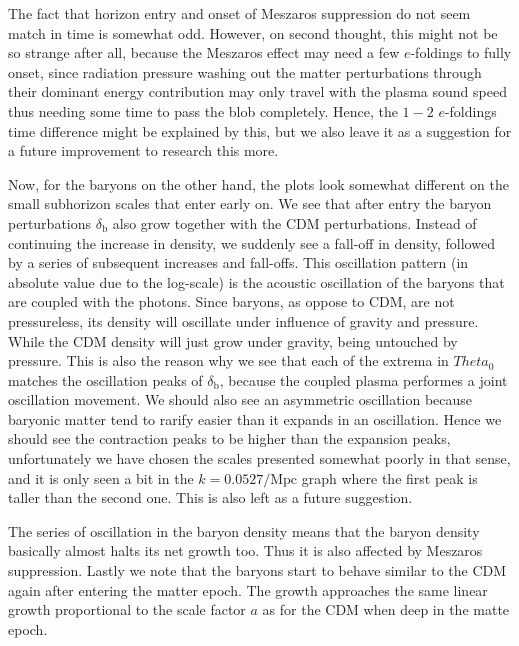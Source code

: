 \documentclass[twocolumn]{aastex62}
\begin{document}
The fact that horizon entry and onset of Meszaros suppression do not seem match in time is somewhat odd. However, on second thought, this might not be so strange after all, because the Meszaros effect may need a few $e$-foldings to fully onset, since radiation pressure washing out the matter perturbations through their dominant energy contribution may only travel with the plasma sound speed thus needing some time to pass the blob completely. Hence, the $1-2$ $e$-foldings time difference might be explained by this, but we also leave it as a suggestion for a future improvement to research this more.   

Now, for the baryons on the other hand, the plots look somewhat different on the small subhorizon scales that enter early on. We see that after entry the baryon perturbations $\delta_\text{b}$ also grow together with the CDM perturbations. Instead of continuing the increase in density, we suddenly see a fall-off in density, followed by a series of subsequent increases and fall-offs. This oscillation pattern (in absolute value due to the log-scale) is the acoustic oscillation of the baryons that are coupled with the photons. Since baryons, as oppose to CDM, are not pressureless, its density will oscillate under influence of gravity and pressure. While the CDM density will just grow under gravity, being untouched by pressure. This is also the reason why we see that each of the extrema in $Theta_0$ matches the oscillation peaks of $\delta_\text{b}$, because the coupled plasma performes a joint oscillation movement. We should also see an asymmetric oscillation because baryonic matter tend to rarify easier than it expands in an oscillation. Hence we should see the contraction peaks to be higher than the expansion peaks, unfortunately we have chosen the scales presented somewhat poorly in that sense, and it is only seen a bit in the $k = 0.0527/\mathrm{Mpc}$ graph where the first peak is taller than the second one. This is also left as a future suggestion. 

The series of oscillation in the baryon density means that the baryon density basically almost halts its net growth too. Thus it is also affected by Meszaros suppression. Lastly we note that the baryons start to behave similar to the CDM again after entering the matter epoch. The growth approaches the same linear growth proportional to the scale factor $a$ as for the CDM when deep in the matte epoch. 
\end{document}

